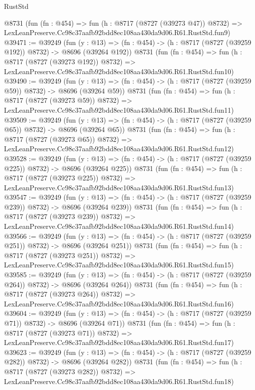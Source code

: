 \begin{lexlean}{RustStd}
\begin{coremodule}
    @8731
    (fun (fn : @454) =>
    fun (h : @8717 (@8727 (@39273 @47)) @8732) =>
    LexLeanPreserve.Cc98c37aafb92bdd8ec108aa430da9d06.R61.RustStd.fun9)
@39471 := @39249
    (fun (y : @13) => (fn : @454) -> (h : @8717 (@8727 (@39259 @192)) @8732) -> @8696 (@39264 @192))
    @8731
    (fun (fn : @454) =>
    fun (h : @8717 (@8727 (@39273 @192)) @8732) =>
    LexLeanPreserve.Cc98c37aafb92bdd8ec108aa430da9d06.R61.RustStd.fun10)
@39490 := @39249
    (fun (y : @13) => (fn : @454) -> (h : @8717 (@8727 (@39259 @59)) @8732) -> @8696 (@39264 @59))
    @8731
    (fun (fn : @454) =>
    fun (h : @8717 (@8727 (@39273 @59)) @8732) =>
    LexLeanPreserve.Cc98c37aafb92bdd8ec108aa430da9d06.R61.RustStd.fun11)
@39509 := @39249
    (fun (y : @13) => (fn : @454) -> (h : @8717 (@8727 (@39259 @65)) @8732) -> @8696 (@39264 @65))
    @8731
    (fun (fn : @454) =>
    fun (h : @8717 (@8727 (@39273 @65)) @8732) =>
    LexLeanPreserve.Cc98c37aafb92bdd8ec108aa430da9d06.R61.RustStd.fun12)
@39528 := @39249
    (fun (y : @13) => (fn : @454) -> (h : @8717 (@8727 (@39259 @225)) @8732) -> @8696 (@39264 @225))
    @8731
    (fun (fn : @454) =>
    fun (h : @8717 (@8727 (@39273 @225)) @8732) =>
    LexLeanPreserve.Cc98c37aafb92bdd8ec108aa430da9d06.R61.RustStd.fun13)
@39547 := @39249
    (fun (y : @13) => (fn : @454) -> (h : @8717 (@8727 (@39259 @239)) @8732) -> @8696 (@39264 @239))
    @8731
    (fun (fn : @454) =>
    fun (h : @8717 (@8727 (@39273 @239)) @8732) =>
    LexLeanPreserve.Cc98c37aafb92bdd8ec108aa430da9d06.R61.RustStd.fun14)
@39566 := @39249
    (fun (y : @13) => (fn : @454) -> (h : @8717 (@8727 (@39259 @251)) @8732) -> @8696 (@39264 @251))
    @8731
    (fun (fn : @454) =>
    fun (h : @8717 (@8727 (@39273 @251)) @8732) =>
    LexLeanPreserve.Cc98c37aafb92bdd8ec108aa430da9d06.R61.RustStd.fun15)
@39585 := @39249
    (fun (y : @13) => (fn : @454) -> (h : @8717 (@8727 (@39259 @264)) @8732) -> @8696 (@39264 @264))
    @8731
    (fun (fn : @454) =>
    fun (h : @8717 (@8727 (@39273 @264)) @8732) =>
    LexLeanPreserve.Cc98c37aafb92bdd8ec108aa430da9d06.R61.RustStd.fun16)
@39604 := @39249
    (fun (y : @13) => (fn : @454) -> (h : @8717 (@8727 (@39259 @71)) @8732) -> @8696 (@39264 @71))
    @8731
    (fun (fn : @454) =>
    fun (h : @8717 (@8727 (@39273 @71)) @8732) =>
    LexLeanPreserve.Cc98c37aafb92bdd8ec108aa430da9d06.R61.RustStd.fun17)
@39623 := @39249
    (fun (y : @13) => (fn : @454) -> (h : @8717 (@8727 (@39259 @282)) @8732) -> @8696 (@39264 @282))
    @8731
    (fun (fn : @454) =>
    fun (h : @8717 (@8727 (@39273 @282)) @8732) =>
    LexLeanPreserve.Cc98c37aafb92bdd8ec108aa430da9d06.R61.RustStd.fun18)

\end{coremodule}
\end{lexlean}
